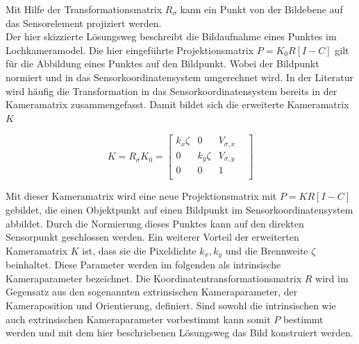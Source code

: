 Mit Hilfe der Transformationsmatrix $R_\sigma$ kann ein Punkt von der Bildebene auf das Sensorelement projiziert werden.\\

Der hier skizzierte Lösungsweg beschreibt die Bildaufnahme eines Punktes im Lochkameramodel. Die hier eingeführte Projektionsmatrix $P=K_0R[I -C]$ gilt für die Abbildung eines Punktes auf den Bildpunkt. Wobei der Bildpunkt normiert und in das Sensorkoordinatensystem umgerechnet wird. In der Literatur wird häufig die Transformation in das Sensorkoordinatensystem bereits in der Kameramatrix zusammengefasst. Damit bildet sich die erweiterte Kameramatrix $K$

\begin{equation}
K=	R_\sigma K_0=  \begin{bmatrix}
k_x \zeta & 0 & V_{\sigma,x}\\
0 & k_y \zeta & V_{\sigma,y}\\
0 & 0   & 1 &\\
\end{bmatrix}
\end{equation}

Mit dieser Kameramatrix wird eine neue Projektionsmatrix mit $P=KR[I -C]$ gebildet, die einen Objektpunkt auf einen Bildpunkt im Sensorkoordinatensystem abbildet. Durch die Normierung dieses Punktes kann auf den direkten Sensorpunkt geschlossen werden. 
Ein weiterer Vorteil der erweiterten Kameramatrix $K$ ist, dass sie die Pixeldichte $k_x,k_y$ und die Brennweite $\zeta$ beinhaltet. Diese Parameter werden im folgenden als intrinsische Kameraparameter bezeichnet. Die Koordinatentransformationsmatrix $R$ wird im Gegensatz aus den sogenannten extrinsischen Kameraparameter, der Kameraposition und Orientierung, definiert. Sind sowohl die intrinsischen wie auch extrinsischen Kameraparameter vorbestimmt kann somit $P$ bestimmt werden und mit dem hier beschriebenen Lösungsweg das Bild konstruiert werden. %




